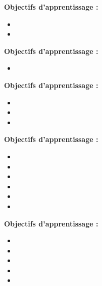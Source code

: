 \endlevel

\par\noindent\textbf{Objectifs d'apprentissage :}
\begin{itemize}
    \item \useobj[C4A3aa]
    \item \useobj[C4A3ab]
\end{itemize}
\endsequence

\par\noindent\textbf{Objectifs d'apprentissage :}
\begin{itemize}
    \item \useobj[C4B3ca]
\end{itemize}
\endsequence

\par\noindent\textbf{Objectifs d'apprentissage :}
\begin{itemize}
    \item \useobj[C4A3ee]
    \item \useobj[C4A3ea]
    \item \useobj[C4A3eb]
\end{itemize}
\endsequence

\par\noindent\textbf{Objectifs d'apprentissage :}
\begin{itemize}
    \item \useobj[C4C3aa]
    \item \useobj[C4C3ab]
    \item \useobj[C4C3ac]
    \item \useobj[C4C3ad]
    \item \useobj[C4C3ae]
    \item \useobj[C4D3aa]
\end{itemize}
\endsequence

\par\noindent\textbf{Objectifs d'apprentissage :}
\begin{itemize}
    \item \useobj[C4A3ca]
    \item \useobj[C4A3cb]
    \item \useobj[C4A3ec]
    \item \useobj[C4A3ed]
    \item \useobj[C4A3ef]
\end{itemize}
\endsequence

